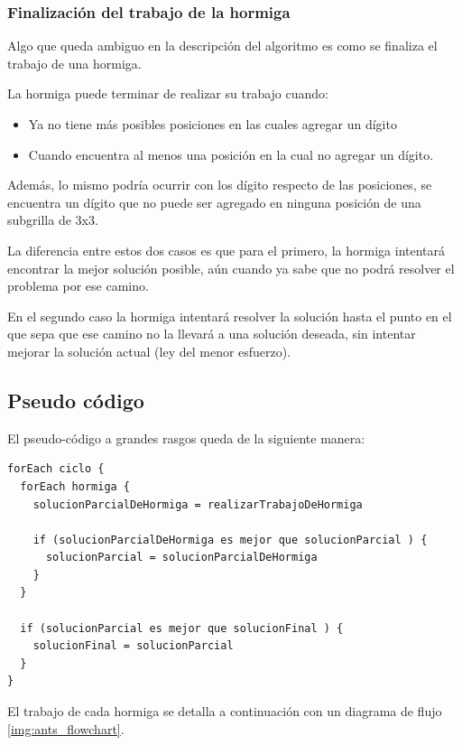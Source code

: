 \documentclass[a4paper,spanish]{article}
\begin{document}
\subsubsection{Finalización del trabajo de la hormiga}

Algo que queda ambiguo en la descripción del algoritmo es como se finaliza el trabajo de una hormiga.

La hormiga puede terminar de realizar su trabajo cuando:

\begin{itemize}
	\item Ya no tiene más posibles posiciones en las cuales agregar un dígito
	\item Cuando encuentra al menos una posición en la cual no agregar un dígito.
\end{itemize}
 
Además, lo mismo podría ocurrir con los dígito respecto de las posiciones, se encuentra un dígito
que no puede ser agregado en ninguna posición de una subgrilla de 3x3.

La diferencia entre estos dos casos es que para el primero, la hormiga intentará encontrar la mejor
solución posible, aún cuando ya sabe que no podrá resolver el problema por ese camino.

En el segundo caso la hormiga intentará resolver la solución hasta el punto en el que sepa que ese
camino no la llevará a una solución deseada, sin intentar mejorar la solución actual (ley del menor esfuerzo).

\subsection{Pseudo código}

El pseudo-código a grandes rasgos queda de la siguiente manera:

\begin{Verbatim}[samepage=true]
forEach ciclo {
  forEach hormiga {
    solucionParcialDeHormiga = realizarTrabajoDeHormiga
    
    if (solucionParcialDeHormiga es mejor que solucionParcial ) {
      solucionParcial = solucionParcialDeHormiga
    }
  }
  
  if (solucionParcial es mejor que solucionFinal ) {
    solucionFinal = solucionParcial
  }
}
\end{Verbatim}

El trabajo de cada hormiga se detalla a continuación con un diagrama de flujo \ref{img:ants_flowchart}.
\end{document}

